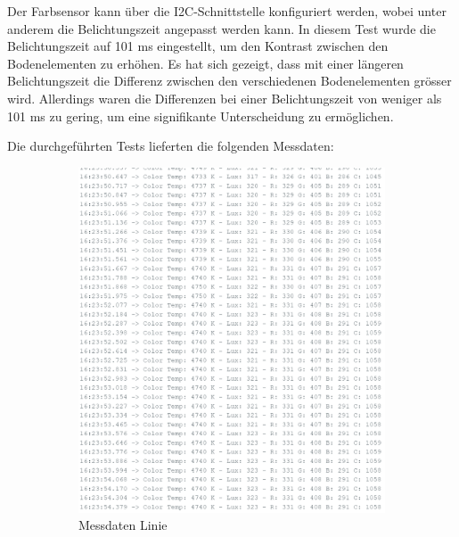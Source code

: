 \documentclass[../main.tex]{subfiles}
\begin{document}
Der Farbsensor kann über die I2C-Schnittstelle konfiguriert werden, wobei unter anderem die Belichtungszeit angepasst werden kann. In diesem Test wurde die Belichtungszeit auf 101 ms eingestellt, um den Kontrast zwischen den Bodenelementen zu erhöhen. Es hat sich gezeigt, dass mit einer längeren Belichtungszeit die Differenz zwischen den verschiedenen Bodenelementen grösser wird. Allerdings waren die Differenzen bei einer Belichtungszeit von weniger als 101 ms zu gering, um eine signifikante Unterscheidung zu ermöglichen.

Die durchgeführten Tests lieferten die folgenden Messdaten:


\begin{figure}[H]
    \centering
    \begin{subfigure}{0.35\textwidth} %
        \centering
        \includegraphics[width=\linewidth]{img/sensortest/MD_Linie_101ms.png}
        \caption{Messdaten Linie}
        \label{fig:MD_Farbsens}
    \end{subfigure}
    \begin{subfigure}{0.35\textwidth}
        \centering

\end{subfigure}
\end{figure}
\end{document}
